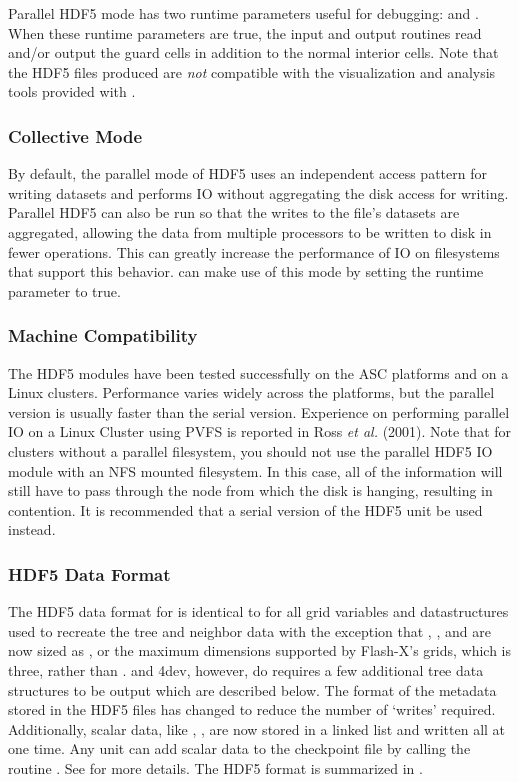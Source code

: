 Parallel HDF5 mode has two runtime parameters useful for debugging:
 and .  When 
these runtime parameters
are true, the \flashx input and output routines read and/or output the guard cells
in addition to the normal interior cells.  Note that the HDF5 files produced are {\em not} 
compatible with the visualization and analysis tools provided with \flashx.



\subsubsection{Collective Mode}
\label{sec:IOCollectiveMode}
By default, the parallel mode of HDF5 uses an independent access pattern for 
writing datasets and performs IO without aggregating the disk access for 
writing.  Parallel HDF5 can also be run so that the writes to the file's 
datasets are aggregated, allowing the data
from multiple processors to be written to disk in fewer operations.  This can 
greatly increase the performance of IO on filesystems that support this behavior.
  \flashx can make use of this mode by setting the runtime parameter  to true.


\subsubsection{Machine Compatibility}
The HDF5 modules have been tested successfully on the ASC platforms
and on a Linux clusters.  Performance varies widely across the
platforms, but the parallel version is usually faster than the serial
version.  Experience on performing parallel IO on a Linux Cluster
using PVFS is reported in Ross {\it et al.} (2001).  Note that for
clusters without a parallel filesystem, you should not use the
parallel HDF5 IO module with an NFS mounted filesystem.  In this
case, all of the information will still have to pass through the node
from which the disk is hanging, resulting in contention.  It is
recommended that a serial version of the HDF5 unit be used instead. 

\subsubsection{HDF5 Data Format}\label{Sec:Data Format}
The HDF5 data format for \flashx is identical to \flashx for all
grid variables and datastructures used to recreate the tree and
neighbor data with the exception that , , and 
are now sized as , or the maximum dimensions supported by Flash-X's 
grids, which is three, rather than .
 and \Paramesh4dev, however, do requires a few additional tree data structures
to be output which are described below.  The format of the metadata stored in the HDF5 files
has changed to reduce the number of `writes' required. Additionally,
scalar data, like , \etc, are now stored in a
linked list and written all at one time.  Any unit can add scalar
data to the checkpoint file by calling the routine
.  See
 for more details.  The \flashx HDF5 format is
summarized in .


